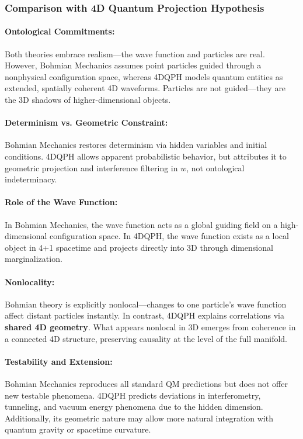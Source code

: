 \documentclass[12pt]{article}
\begin{document}
\subsubsection*{Comparison with 4D Quantum Projection Hypothesis}

\paragraph{Ontological Commitments:}
Both theories embrace realism—the wave function and particles are real. However, Bohmian Mechanics assumes point particles guided through a nonphysical configuration space, whereas 4DQPH models quantum entities as extended, spatially coherent 4D waveforms. Particles are not guided—they are the 3D shadows of higher-dimensional objects.

\paragraph{Determinism vs. Geometric Constraint:}
Bohmian Mechanics restores determinism via hidden variables and initial conditions. 4DQPH allows apparent probabilistic behavior, but attributes it to geometric projection and interference filtering in \( w \), not ontological indeterminacy.

\paragraph{Role of the Wave Function:}
In Bohmian Mechanics, the wave function acts as a global guiding field on a high-dimensional configuration space. In 4DQPH, the wave function exists as a local object in 4+1 spacetime and projects directly into 3D through dimensional marginalization.

\paragraph{Nonlocality:}
Bohmian theory is explicitly nonlocal—changes to one particle’s wave function affect distant particles instantly. In contrast, 4DQPH explains correlations via \textbf{shared 4D geometry}. What appears nonlocal in 3D emerges from coherence in a connected 4D structure, preserving causality at the level of the full manifold.

\paragraph{Testability and Extension:}
Bohmian Mechanics reproduces all standard QM predictions but does not offer new testable phenomena. 4DQPH predicts deviations in interferometry, tunneling, and vacuum energy phenomena due to the hidden dimension. Additionally, its geometric nature may allow more natural integration with quantum gravity or spacetime curvature.
\end{document}
